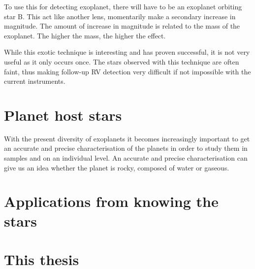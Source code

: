 To use this for detecting exoplanet, there will have to be an exoplanet orbiting star B. This act
like another lens, momentarily make a secondary increase in magnitude. The amount of increase in
magnitude is related to the mass of the exoplanet. The higher the mass, the higher the effect.

While this exotic technique is interesting and has proven successful, it is not very useful as it
only occurs once. The stars observed with this technique are often faint, thus making follow-up RV
detection very difficult if not impossible with the current instruments.



\section{Planet host stars}
\label{sec:planet_host_stars}

With the present diversity of exoplanets it becomes increasingly important to get an accurate and
precise characterisation of the planets in order to study them in samples and on an individual
level. An accurate and precise characterisation can give us an idea whether the planet is rocky,
composed of water or gaseous.



\section{Applications from knowing the stars}
\label{sec:stars_application}





\section{This thesis}
\label{sec:this_thesis}
